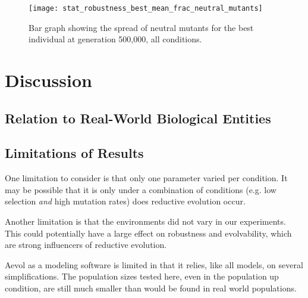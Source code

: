 \begin{figure}[H]
	\centering
	\texttt{[image: stat\_robustness\_best\_mean\_frac\_neutral\_mutants]}
	\caption[Robustness bar graph]{Bar graph showing the spread of neutral mutants for the best individual at generation 500,000, all conditions.}
	\label{fig:mean_robustness_all_conditions}
\end{figure}

\section{Discussion}\label{discussion}

\subsection{Relation to Real-World Biological Entities}
\subsection{Limitations of Results}\label{limitations}
One limitation to consider is that only one parameter varied per condition. It may be possible that it is only under a combination of conditions (e.g. low selection \textit{and} high mutation rates) does reductive evolution occur. 

Another limitation is that the environments did not vary in our experiments. This could potentially have a large effect on robustness and evolvability, which are strong influencers of reductive evolution. 

Aevol as a modeling software is limited in that it relies, like all models, on several simplifications. The population sizes tested here, even in the population up condition, are still much smaller than would be found in real world populations. 